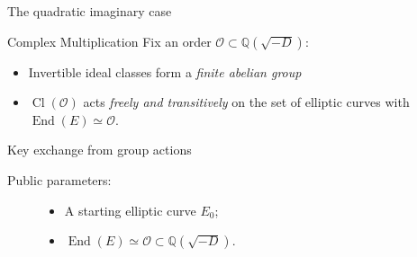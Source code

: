 \documentclass[aspectratio=169]{beamer}
\renewcommand{\O}{\mathcal{O}}
\newcommand{\End}{\operatorname{End}}
\newcommand{\Cl}{\operatorname{Cl}}
\renewcommand{\a}{\mathfrak{a}}
\renewcommand{\b}{\mathfrak{b}}
\begin{document}

\begin{frame}{The quadratic imaginary case}
  \begin{block}{Complex Multiplication}
    Fix an order \emph{$\O ⊂ ℚ(\sqrt{-D})$}:
    \begin{itemize}
    \item Invertible ideal classes form a \emph{finite abelian group}
    \item $\Cl(\O)$ acts \emph{freely and transitively} on the set of
      elliptic curves with $\End(E) ≃ \O$.
    \end{itemize}
  \end{block}
\end{frame}


\begin{frame}{Key exchange from group actions}
  \begin{description}
  \item[Public parameters:]
    \begin{minipage}{0.6\linewidth}
      \begin{itemize}
      \item A starting elliptic curve $E_0$;
      \item $\End(E) ≃ \O ⊂ ℚ(\sqrt{-D})$.
      \end{itemize}
    \end{minipage}
  \end{description}

  \bigskip
  
  \begin{center}
  \end{center}
\end{frame}

\end{document}
